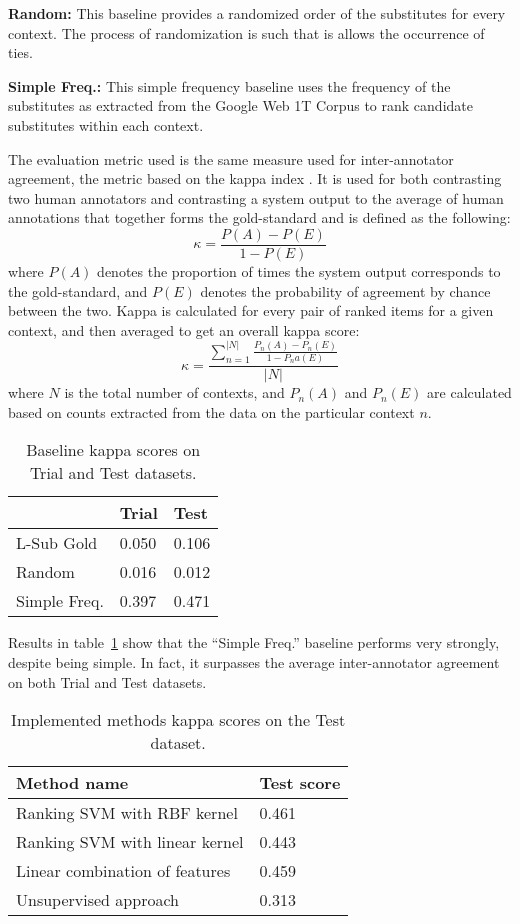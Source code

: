 \documentclass[10pt, a4paper]{article}
\begin{document}
\textbf{Random:} This baseline provides a randomized order of the substitutes for every context. The process of randomization is such that is allows the occurrence of ties.

\textbf{Simple Freq.:} This simple frequency baseline uses the frequency of the substitutes as extracted from the Google Web 1T Corpus \citep{brants2006web} to rank candidate substitutes within each context.
 
 The evaluation metric used is the same measure used for inter-annotator agreement, the metric based on the kappa index \citep{kohen1960coefficient}. It is used for both contrasting two human annotators and contrasting a system output to the average of human annotations that together forms the gold-standard and is defined as the following:
\[ \kappa = \frac{P(A) - P(E)}{1 - P(E)} \]
where $P(A)$ denotes the proportion of times the system output corresponds to the gold-standard, and $P(E)$ denotes the probability of agreement by chance between the two. Kappa is calculated for every pair of ranked items for a given context, and then averaged to get an overall kappa score:
\[ \kappa = \frac{\sum_{n=1}^{|N|} \frac{P_n(A) - P_n(E)}{1 - P_na(E)}}{|N|} \]
where $N$ is the total number of contexts, and $P_n(A)$ and $P_n(E)$ are calculated based on counts extracted from the data on the particular context $n$.

\begin{table}
\caption{Baseline kappa scores on Trial and Test datasets.}
\label{tab:baseline}
\begin{center}
\begin{tabular}{lll}
\toprule
& Trial & Test \\
\midrule
L-Sub Gold & 0.050 & 0.106 \\
Random & 0.016 & 0.012 \\
Simple Freq. & 0.397 & 0.471 \\
\bottomrule
\end{tabular}
\end{center}
\end{table}

Results in table~\ref{tab:baseline} show that the “Simple Freq.” baseline performs very strongly, despite being simple. In fact, it surpasses the average inter-annotator agreement on both Trial and Test datasets.

\begin{table}
\caption{Implemented methods kappa scores on the Test dataset.}
\label{tab:res}
\begin{center}
\begin{tabular}{ll}
\toprule
Method name & Test score \\
\midrule
Ranking SVM with RBF kernel & 0.461 \\
Ranking SVM with linear kernel & 0.443 \\
Linear combination of features & 0.459 \\
Unsupervised approach & 0.313 \\
\bottomrule
\end{tabular}
\end{center}
\end{table}
\end{document}
